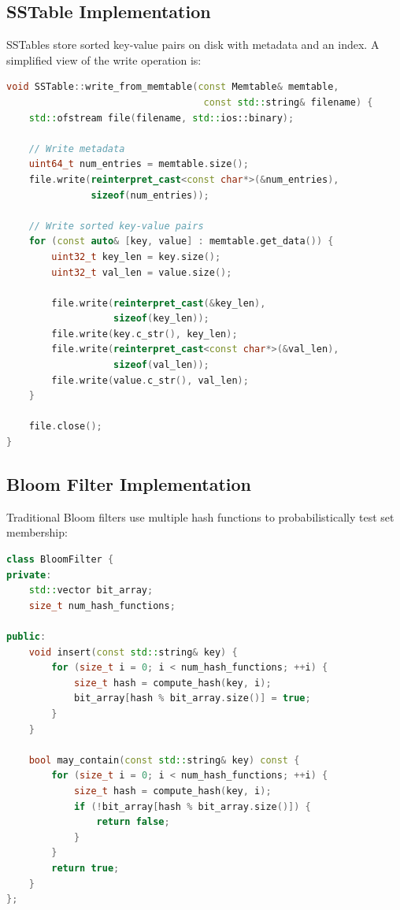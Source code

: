 \documentclass{mnitjaipur}
\begin{document}
\subsection{SSTable Implementation}
SSTables store sorted key-value pairs on disk with metadata and an index. A simplified view of the write operation is:

\begin{lstlisting}[language=C++, caption={Writing a Memtable to SSTable}, label={lst:sstable-write}]
void SSTable::write_from_memtable(const Memtable& memtable, 
                                   const std::string& filename) {
    std::ofstream file(filename, std::ios::binary);
    
    // Write metadata
    uint64_t num_entries = memtable.size();
    file.write(reinterpret_cast<const char*>(&num_entries), 
               sizeof(num_entries));
    
    // Write sorted key-value pairs
    for (const auto& [key, value] : memtable.get_data()) {
        uint32_t key_len = key.size();
        uint32_t val_len = value.size();
        
        file.write(reinterpret_cast(&key_len), 
                   sizeof(key_len));
        file.write(key.c_str(), key_len);
        file.write(reinterpret_cast<const char*>(&val_len), 
                   sizeof(val_len));
        file.write(value.c_str(), val_len);
    }
    
    file.close();
}
\end{lstlisting}

\subsection{Bloom Filter Implementation}
Traditional Bloom filters use multiple hash functions to probabilistically test set membership:

\begin{lstlisting}[language=C++, caption={Traditional Bloom Filter operations}, label={lst:bloom-filter}]
class BloomFilter {
private:
    std::vector bit_array;
    size_t num_hash_functions;
    
public:
    void insert(const std::string& key) {
        for (size_t i = 0; i < num_hash_functions; ++i) {
            size_t hash = compute_hash(key, i);
            bit_array[hash % bit_array.size()] = true;
        }
    }
    
    bool may_contain(const std::string& key) const {
        for (size_t i = 0; i < num_hash_functions; ++i) {
            size_t hash = compute_hash(key, i);
            if (!bit_array[hash % bit_array.size()]) {
                return false;
            }
        }
        return true;
    }
};
\end{lstlisting}
\end{document}
